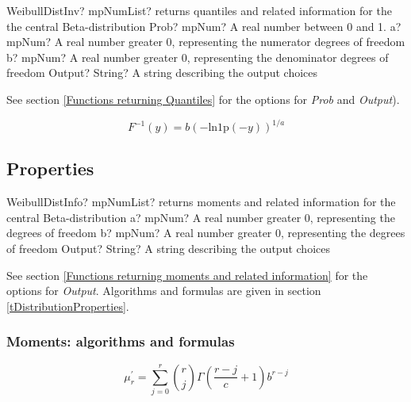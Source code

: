\begin{mpFunctionsExtract}
	\mpFunctionFour
	{WeibullDistInv? mpNumList? returns quantiles and related information for the the central Beta-distribution}
	{Prob? mpNum? A real number between 0 and 1.}
	{a? mpNum? A real number greater 0, representing the numerator  degrees of freedom}
	{b? mpNum? A real number greater 0, representing the denominator degrees of freedom}
	{Output? String? A string describing the output choices}
\end{mpFunctionsExtract}

See section \ref{Functions returning Quantiles} for the options for  {\itshape\sffamily Prob} and {\itshape\sffamily Output}). 


\vspace{0.3cm}
\begin{equation} 
	F^{-1}(y)= b (- \text{ln1p}(-y))^{1/a}
\end{equation}



\subsection{Properties}


\begin{mpFunctionsExtract}
	\mpFunctionThree
	{WeibullDistInfo? mpNumList? returns moments and related information for the central Beta-distribution}
	{a? mpNum? A real number greater 0, representing the degrees of freedom}
	{b? mpNum? A real number greater 0, representing the degrees of freedom}
	{Output? String? A string describing the output choices}
\end{mpFunctionsExtract}

\vspace{0.3cm}

See section \ref{Functions returning moments and related information} for the options for {\itshape\sffamily Output}. Algorithms and formulas are given in section \ref{tDistributionProperties}.



\subsubsection{Moments: algorithms and formulas}

\begin{equation} 
	\mu_r^{'} = \sum_{j=0}^r \binom{r}{j} \Gamma\left(\frac{r-j}{c}+1 \right) b^{r-j}
\end{equation}


